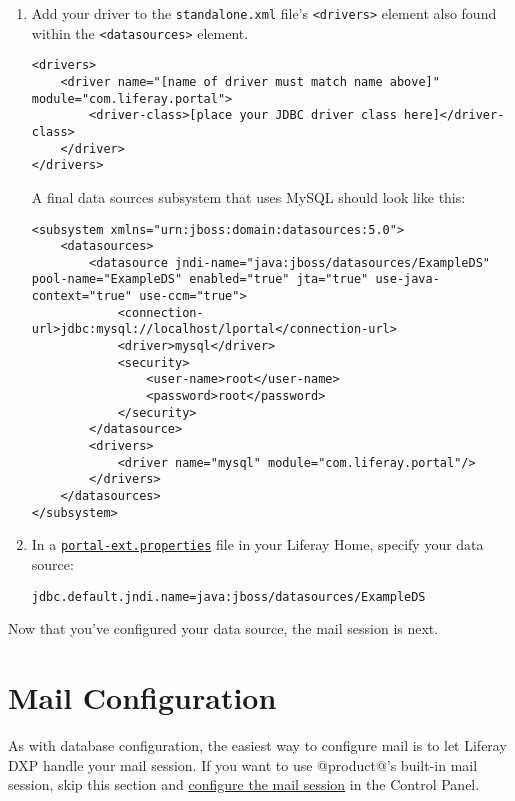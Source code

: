 \begin{enumerate}
\def\labelenumi{\arabic{enumi}.}
\setcounter{enumi}{1}
\item
  Add your driver to the \texttt{standalone.xml} file's
  \texttt{\textless{}drivers\textgreater{}} element also found within
  the \texttt{\textless{}datasources\textgreater{}} element.

\begin{verbatim}
<drivers>
    <driver name="[name of driver must match name above]" module="com.liferay.portal">
        <driver-class>[place your JDBC driver class here]</driver-class>
    </driver>
</drivers>
\end{verbatim}

  A final data sources subsystem that uses MySQL should look like this:

\begin{verbatim}
<subsystem xmlns="urn:jboss:domain:datasources:5.0">
    <datasources>
        <datasource jndi-name="java:jboss/datasources/ExampleDS" pool-name="ExampleDS" enabled="true" jta="true" use-java-context="true" use-ccm="true">
            <connection-url>jdbc:mysql://localhost/lportal</connection-url>
            <driver>mysql</driver>
            <security>
                <user-name>root</user-name>
                <password>root</password>
            </security>
        </datasource>
        <drivers>
            <driver name="mysql" module="com.liferay.portal"/>
        </drivers>
    </datasources>
</subsystem>
\end{verbatim}
\item
  In a
  \href{/docs/7-2/deploy/-/knowledge_base/d/portal-properties}{\texttt{portal-ext.properties}}
  file in your Liferay Home, specify your data source:

\begin{verbatim}
jdbc.default.jndi.name=java:jboss/datasources/ExampleDS
\end{verbatim}
\end{enumerate}

Now that you've configured your data source, the mail session is next.

\section{Mail Configuration}\label{mail-configuration-2}

As with database configuration, the easiest way to configure mail is to
let Liferay DXP handle your mail session. If you want to use @product@'s
built-in mail session, skip this section and
\href{/docs/7-2/deploy/-/knowledge_base/d/configuring-mail}{configure
the mail session} in the Control Panel.

